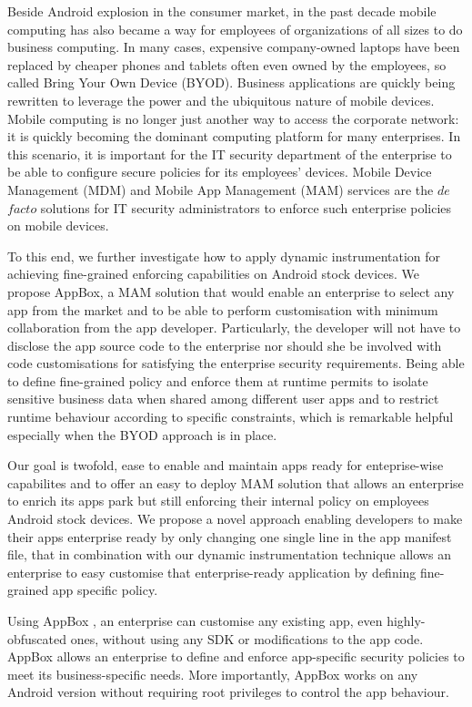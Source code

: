 Beside Android explosion in the consumer market, in the past decade mobile computing has also became a way for employees of organizations of all sizes to do business computing.  In many cases, expensive company-owned laptops have been replaced by cheaper phones and tablets often even owned by the employees, so called Bring Your Own Device (BYOD). Business applications are quickly being rewritten to leverage the power and the ubiquitous nature of mobile devices. Mobile computing is no longer just another way to access the corporate network: it is quickly becoming the dominant computing platform for many enterprises. In this scenario, it is important for the IT security department of the enterprise to be able to configure secure policies for its employees' devices. Mobile Device Management (MDM) and Mobile App Management (MAM) services are the $de$ $facto$ solutions for IT security administrators to enforce such enterprise policies on mobile devices.

To this end, we further investigate how to apply dynamic instrumentation for achieving fine-grained enforcing capabilities on Android stock devices. We propose AppBox, a MAM solution that would enable an enterprise to select any app from the market and to be able to perform customisation with minimum collaboration from the app developer. Particularly, the developer will not have to disclose the app source code to the enterprise nor should she be involved with code customisations for satisfying the enterprise security requirements. Being able to define fine-grained policy and enforce them at runtime permits to isolate sensitive business data when shared among different user apps and to restrict runtime behaviour according to specific constraints, which is remarkable helpful especially when the BYOD approach is in place. 

Our goal is twofold, ease to enable and maintain apps ready for enteprise-wise capabilites and to offer an easy to deploy MAM solution that allows an enterprise to enrich its apps park but still enforcing their internal policy on employees Android stock devices. We propose a novel approach enabling developers to make their apps enterprise ready by only changing one single line in the app manifest file, that in combination with our dynamic instrumentation technique allows an enterprise to easy customise that enterprise-ready application by defining fine-grained app specific policy. 

Using AppBox , an enterprise can customise any existing app, even highly-obfuscated ones, without using any SDK or modifications to the app code. AppBox allows an enterprise to define and enforce app-specific security policies to meet its business-specific needs. More importantly, AppBox works on any Android version without requiring root privileges to control the app behaviour.

